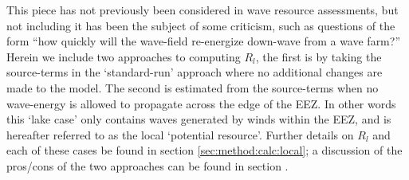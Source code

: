 This piece has not previously been considered in wave resource assessments, but not including it has been the subject of some criticism, such as questions of the form ``how quickly will the wave-field re-energize down-wave from a wave farm?''
Herein we include two approaches to computing $R_l$, the first is by taking the source-terms in the `standard-run' approach where no additional changes are made to the model. The second is estimated from the source-terms when no wave-energy is allowed to propagate across the edge of the EEZ. In other words this `lake case' only contains waves generated by winds within the EEZ, and is hereafter referred to as the local `potential resource'. Further details on $R_l$ and each of these cases be found in section \ref{sec:method:calc:local}; a discussion of the pros/cons of the two approaches can be found in section .

